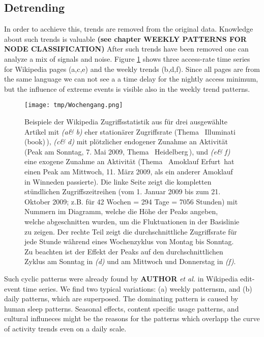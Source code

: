 \documentclass[a4paper,10pt]{scrbook}
\begin{document}
\subsection{Detrending}
In order to acchieve this, trends are removed from the original data. Knowledge about such trends is valuable \textbf{(see chapter WEEKLY PATTERNS FOR NODE CLASSIFICATION)} After such trends have been removed one can analyze a mix of signals and noise. Figure \ref{sampleseries} shows three access-rate time series for Wikipedia pages (a,c,e) and the weekly trends (b,d,f). Since all pages are from the same language we can not see a a time delay for the nightly access minimum, but the influence of extreme events is visible also in the weekly trend patterns.  

\begin{figure}[b!]
	\centering
	\texttt{[image: tmp/Wochengang.png]}
	\caption{Beispiele der Wikipedia Zugriffsstatistik aus \cite{Burst} für drei ausgewählte Artikel mit \textit{(a\& b)} eher stationärer Zugriffsrate (Thema \,  Illuminati (book)\,), \textit{(c\& d)} mit plötzlicher endogener Zunahme an Aktivität (Peak am Sonntag, 7. Mai 2009, Thema \,  Heidelberg\,), und \textit{(e\& f)} eine exogene Zunahme an Aktivität (Thema \,  Amoklauf Erfurt\, hat einen Peak am Mittwoch, 11. März 2009, als ein anderer Amoklauf in Winneden passierte). Die linke Seite zeigt die kompletten stündlichen Zugriffszeitreihen (vom 1. Januar 2009 bis zum 21. Oktober 2009; z.B. für 42 Wochen = 294 Tage = 7056 Stunden) mit Nummern im Diagramm, welche die Höhe der Peaks angeben, welche abgeschnitten wurden, um die Fluktuationen in der Basislinie zu zeigen. Der rechte Teil zeigt die durchschnittliche Zugriffsrate für jede Stunde während eines Wochenzyklus von Montag bis Sonntag. Zu beachten ist der Effekt der Peaks auf den durchschnittlichen Zyklus am Sonntag in \textit{(d)} und am Mittwoch und Donnerstag in \textit{(f)}.}

\label{sampleseries}	
\end{figure}

Such cyclic patterns were already found by \textbf{AUTHOR} \textit{et al.} \cite{CircadianPatterns} in Wikipedia edit-event time series. We find two typical variations: (a) weekly patternsm, and (b) daily patterns, which are superposed. The dominating pattern is caused by human sleep patterns. Seasonal effects, content specific usage patterns, and cultural influneces might be the reasons for the patterns which overlapp the curve of activity trends even on a daily scale.
\end{document}

